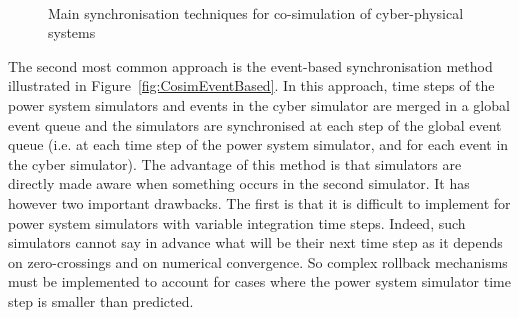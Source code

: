 \begin{figure}
\centering
{} \\ \vspace*{0.5cm} %
{}
\caption{Main synchronisation techniques for co-simulation of cyber-physical systems~\cite{CosimFigure}}
\label{fig:Cosim}
\end{figure}

The second most common approach is the event-based synchronisation method illustrated in Figure~\ref{fig:CosimEventBased}. In this approach, time steps of the power system simulators and events in the cyber simulator are merged in a global event queue and the simulators are synchronised at each step of the global event queue (i.e. at each time step of the power system simulator, and for each event in the cyber simulator). The advantage of this method is that simulators are directly made aware when something occurs in the second simulator. It has however two important drawbacks. The first is that it is difficult to implement for power system simulators with variable integration time steps. Indeed, such simulators cannot say in advance what will be their next time step as it depends on zero-crossings and on numerical convergence. So complex rollback mechanisms must be implemented to account for cases where the power system simulator time step is smaller than predicted.

